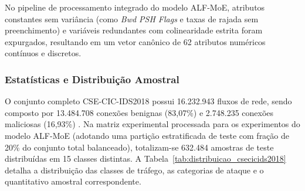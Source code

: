 No pipeline de processamento integrado do modelo ALF-MoE, atributos constantes sem variância (como \emph{Bwd PSH Flags} e taxas de rajada sem preenchimento) e variáveis redundantes com colinearidade estrita foram expurgados, resultando em um vetor canônico de 62 atributos numéricos contínuos e discretos.

\subsubsection{Estatísticas e Distribuição Amostral}

O conjunto completo CSE-CIC-IDS2018 possui 16.232.943 fluxos de rede, sendo composto por 13.484.708 conexões benignas (83,07\%) e 2.748.235 conexões maliciosas (16,93\%) \cite{standard2021}. Na matriz experimental processada para os experimentos do modelo ALF-MoE (adotando uma partição estratificada de teste com fração de 20\% do conjunto total balanceado), totalizam-se 632.484 amostras de teste distribuídas em 15 classes distintas. A Tabela~\ref{tab:distribuicao_csecicids2018} detalha a distribuição das classes de tráfego, as categorias de ataque e o quantitativo amostral correspondente.

